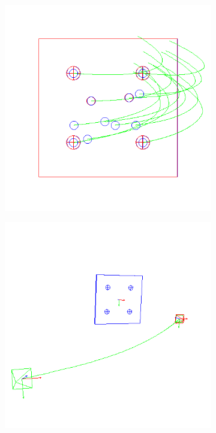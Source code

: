 \begin{figure}[ht!]
\centering
  \centering
  \begin{subfigure}{.48\linewidth}
    \centering
    \includegraphics[width=\linewidth]{figures/plots/ex5cimage.png}
    \caption{}
    \label{fig:ex5cimage}
  \end{subfigure}
  \begin{subfigure}{.48\linewidth}
    \centering
    \includegraphics[width=\linewidth]{figures/plots/ex5cscene.png}

\end{subfigure}
\end{figure}
